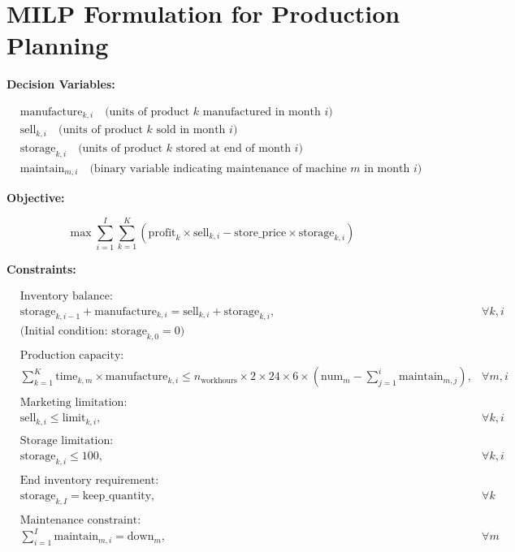 \documentclass{article}
\begin{document}
\section*{MILP Formulation for Production Planning}

\textbf{Decision Variables:}

\begin{align*}
& \text{manufacture}_{k, i} \quad \text{(units of product $k$ manufactured in month $i$)} \\
& \text{sell}_{k, i} \quad \text{(units of product $k$ sold in month $i$)} \\
& \text{storage}_{k, i} \quad \text{(units of product $k$ stored at end of month $i$)} \\
& \text{maintain}_{m, i} \quad \text{(binary variable indicating maintenance of machine $m$ in month $i$)}
\end{align*}

\textbf{Objective:}

\[
\max \sum_{i=1}^{I} \sum_{k=1}^{K} \left( \text{profit}_{k} \times \text{sell}_{k, i} - \text{store\_price} \times \text{storage}_{k, i} \right)
\]

\textbf{Constraints:}

\begin{align*}
& \text{Inventory balance:} \\
& \text{storage}_{k, i-1} + \text{manufacture}_{k, i} = \text{sell}_{k, i} + \text{storage}_{k, i}, & \forall k, i \\
& \text{(Initial condition: } \text{storage}_{k, 0} = 0) \\
\\
& \text{Production capacity:} \\
& \sum_{k=1}^{K} \text{time}_{k, m} \times \text{manufacture}_{k, i} \leq n_{\text{workhours}} \times 2 \times 24 \times 6 \times (\text{num}_{m} - \sum_{j=1}^{i} \text{maintain}_{m, j}), & \forall m, i \\
\\
& \text{Marketing limitation:} \\
& \text{sell}_{k, i} \leq \text{limit}_{k, i}, & \forall k, i \\
\\
& \text{Storage limitation:} \\
& \text{storage}_{k, i} \leq 100, & \forall k, i \\
\\
& \text{End inventory requirement:} \\
& \text{storage}_{k, I} = \text{keep\_quantity}, & \forall k \\
\\
& \text{Maintenance constraint:} \\
& \sum_{i=1}^{I} \text{maintain}_{m, i} = \text{down}_{m}, & \forall m
\end{align*}
\end{document}
